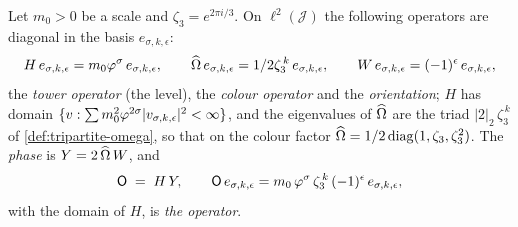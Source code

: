 \begin{definition}\label{def:operators-J}
Let $m_0>0$ be a scale and $\zeta_3=e^{2\pi i/3}$.  On $\ell^2(\mathcal J)$ the following operators are diagonal in
the basis $e_{\sigma,k,\epsilon}$:
\[
  H\,e_{\sigma,k,\epsilon}=m_0\varphi^{\sigma}\,e_{\sigma,k,\epsilon},\qquad
  \widehat{\Omega}\,e_{\sigma,k,\epsilon}=1/2\zeta_3^{\,k}\,e_{\sigma,k,\epsilon},\qquad
  W\,e_{\sigma,k,\epsilon}=(-1)^{\epsilon}\,e_{\sigma,k,\epsilon},
\]
the \emph{tower operator} (the level), the \emph{colour operator} and the \emph{orientation}; $H$ has domain
$\{v:\sum m_0^2\varphi^{2\sigma}|v_{\sigma,k,\epsilon}|^2<\infty\}$, and the eigenvalues of $\widehat{\Omega}$ are the triad
$|2|_2\,\zeta_3^{\,k}$ of \cref{def:tripartite-omega}, so that on the colour factor
$\widehat{\Omega}=1/2\operatorname{diag}(1,\zeta_3,\zeta_3^2)$.  The \emph{phase} is $Y=2\,\widehat{\Omega}\,W$, and
\[
  \mathsf{O}\;=\;H\,Y ,\qquad
  \mathsf{O}\,e_{\sigma,k,\epsilon}=m_0\,\varphi^{\sigma}\,\zeta_3^{\,k}\,(-1)^{\epsilon}\,e_{\sigma,k,\epsilon},
\]
with the domain of $H$, is \emph{the operator}.
\end{definition}

